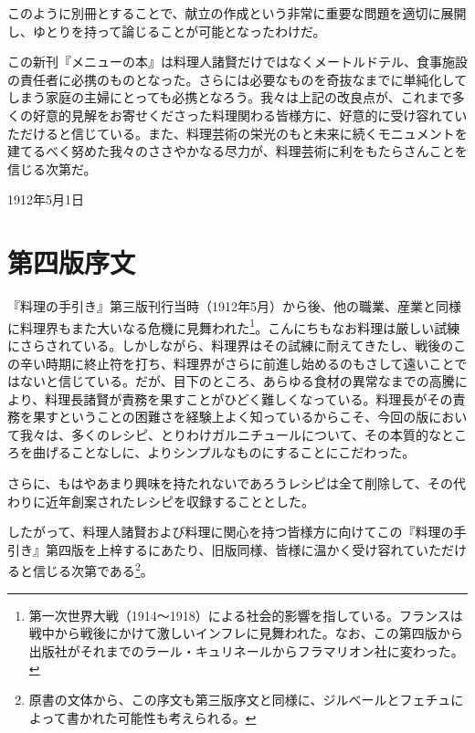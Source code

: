 \begin{Main}
このように別冊とすることで、献立の作成という非常に重要な問題を適切に展開し、ゆとりを持って論じることが可能となったわけだ。

この新刊『メニューの本』は料理人諸賢だけではなくメートルドテル、食事施設の責任者に必携のものとなった。さらには必要なものを奇抜なまでに単純化してしまう家庭の主婦にとっても必携となろう。我々は上記の改良点が、これまで多くの好意的見解をお寄せくださった料理関わる皆様方に、好意的に受け容れていただけると信じている。また、料理芸術の栄光のもと未来に続くモニュメントを建てるべく努めた我々のささやかなる尽力が、料理芸術に利をもたらさんことを信じる次第だ。

\begin{flushright}
1912年5月1日
\end{flushright}

\hypertarget{introduction-quatrieme-edition}{%
\section{第四版序文}\label{introduction-quatrieme-edition}}

\vspace*{1\zw}

『料理の手引き』第三版刊行当時（1912年5月）から後、他の職業、産業と同様に料理界もまた大いなる危機に見舞われた\footnote{第一次世界大戦（1914〜1918）による社会的影響を指している。フランスは戦中から戦後にかけて激しいインフレに見舞われた。なお、この第四版から出版社がそれまでのラール・キュリネールからフラマリオン社に変わった。}。こんにちもなお料理は厳しい試練にさらされている。しかしながら、料理界はその試練に耐えてきたし、戦後のこの辛い時期に終止符を打ち、料理界がさらに前進し始めるのもさして遠いことではないと信じている。だが、目下のところ、あらゆる食材の異常なまでの高騰により、料理長諸賢が責務を果すことがひどく難しくなっている。料理長がその責務を果すということの困難さを経験上よく知っているからこそ、今回の版において我々は、多くのレシピ、とりわけガルニチュールについて、その本質的なところを曲げることなしに、よりシンプルなものにすることにこだわった。

さらに、もはやあまり興味を持たれないであろうレシピは全て削除して、その代わりに近年創案されたレシピを収録することとした。

したがって、料理人諸賢および料理に関心を持つ皆様方に向けてこの『料理の手引き』第四版を上梓するにあたり、旧版同様、皆様に温かく受け容れていただけると信じる次第である\footnote{原書の文体から、この序文も第三版序文と同様に、ジルベールとフェチュによって書かれた可能性も考えられる。}。


\end{Main}
